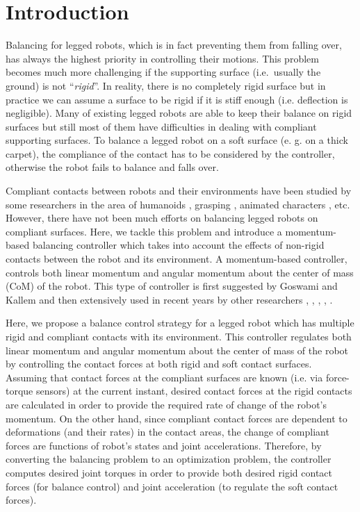 \documentclass[a4paper, 11pt]{article}
\begin{document}
\section{Introduction}
\label{intro}

Balancing for legged robots, which is in fact preventing them from falling
over, has always the highest priority in controlling their motions.  This
problem becomes much more challenging if the supporting surface (i.e.\ usually
the ground) is not ``\emph{rigid}''.  In reality, there is no completely rigid
surface but in practice we can assume a surface to be rigid if it is stiff
enough (i.e. deflection is negligible).  Many of existing legged robots are
able to keep their balance on rigid surfaces but still most of them have
difficulties in dealing with compliant supporting surfaces.  To balance a
legged robot on a soft surface (e. g.  on a thick carpet), the compliance of
the contact has to be considered by the controller, otherwise the robot fails
to balance and falls over.

Compliant contacts between robots and their environments have been studied by
some researchers in the area of humanoids \cite{Bouyarmane&Kheddar11},
grasping \cite{Xydes&Kao99}, animated characters \cite{Jain&Liu11}, etc.
However, there have not been much efforts on balancing legged robots on
compliant surfaces.  Here, we tackle this problem and introduce a
momentum-based balancing controller which takes into account the effects of
non-rigid contacts between the robot and its environment.  A momentum-based
controller, controls both linear momentum and angular momentum about the
center of mass (CoM) of the robot.  This type of controller is first suggested
by Goswami and Kallem \cite{Goswami&Kallem04} and then extensively used in
recent years by other researchers \cite{Azadetal14},
\cite{Azad&Featherstone12}, \cite{Hofmannetal09}, \cite{Lee&Goswami12},
\cite{Macchiettoetal09}.


Here, we propose a balance control strategy for a legged robot which has
multiple rigid and compliant contacts with its environment.  This controller
regulates both linear momentum and angular momentum about the center of mass
of the robot by controlling the contact forces at both rigid and soft contact
surfaces.  Assuming that contact forces at the compliant surfaces are known
(i.e. via force-torque sensors) at the current instant, desired contact forces
at the rigid contacts are calculated in order to provide the required rate of
change of the robot's momentum.  On the other hand, since compliant contact
forces are dependent to deformations (and their rates) in the contact areas,
the change of compliant forces are functions of robot's states and joint
accelerations.  Therefore, by converting the balancing problem to an
optimization problem, the controller computes desired joint torques in order
to provide both desired rigid contact forces (for balance control) and joint
acceleration (to regulate the soft contact forces).
\end{document}
